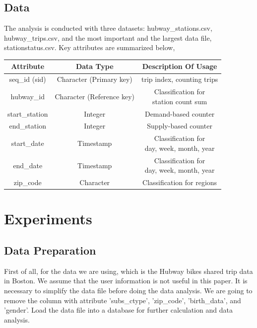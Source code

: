 \documentclass[journal, letterpaper]{IEEEtran}
\begin{document}
\subsection{Data}
The analysis is conducted with three datasets: hubway\_stations.csv, hubway\_trips.csv, and the most important and the largest data file, stationstatus.csv. Key attributes are summarized below, 
\begin{table}[ht]
\centering %
\begin{tabular}{c| c| c} %
\hline\hline %
Attribute & Data Type & Description Of Usage  \\  %
\hline %
seq\_id (sid) & Character (Primary key) & trip index, counting trips  \\ %
\hline
hubway\_id & Character (Reference key) & \pbox{20cm}{Classification for \\ station count sum}  \\
\hline
start\_station & Integer & Demand-based counter  \\
\hline
end\_station & Integer & Supply-based counter   \\
\hline
start\_date & Timestamp & \pbox{20cm}{Classification for \\ day, week, month, year}  \\  %
\hline
end\_date & Timestamp & \pbox{20cm}{Classification for \\ day, week, month, year} \\
\hline
zip\_code & Character & Classification for regions \\
\hline %
\end{tabular}
\label{table:nonlin} %
\end{table}

\section{Experiments}
\large
\subsection{Data Preparation}
First of all, for the data we are using, which is the Hubway bikes shared trip data in Boston. We assume that the user information is not useful in this paper. It is necessary to simplify the data file before doing the data analysis. We are going to remove the column with attribute 'subs\_ctype', 'zip\_code', 'birth\_data', and 'gender'. Load the data file into a database for further calculation and data analysis. 
\end{document}
